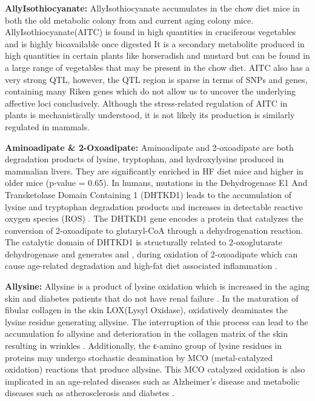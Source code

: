 \documentclass[a4paper,11pt,twoside]{book}
\begin{document}
    \textbf{AllyIsothiocyanate:}
	AllyIsothiocyanate accumulates in the chow diet mice in both the old metabolic colony from \citep{Williams2016SystemsFunction} and current aging colony mice. AllyIsothiocyanate(AITC) is found in high quantities in cruciferous vegetables and is highly bioavailable once digested \citep{Zlatkis1971ProfileUrine.} It is a secondary metabolite produced in high quantities in certain plants like horseradish and mustard but can be found in a large range of vegetables that may be present in the chow diet. AITC also has a very strong QTL, however, the QTL region is sparse in terms of SNPs and genes, containing many Riken genes which do not allow us to uncover the underlying affective loci conclusively. Although the stress-related regulation of AITC in plants is mechanistically understood, it is not likely its production is similarly regulated in mammals\citep{Kissen2016Allylisothiocyanate}.  

	\textbf{Aminoadipate \& 2-Oxoadipate:}
	Aminoadipate and 2-oxoadipate are both degradation products of lysine, tryptophan, and hydroxylysine produced in mammalian livers\citep{Higashino1965Saccharopine}. They are significantly enriched in HF diet mice and higher in older mice (p-value = 0.65). In humans, mutations in the Dehydrogenase E1 And Transketolase Domain Containing 1 (DHTKD1) leads to the accumulation of lysine and tryptophan degradation products and increases in detectable reactive oxygen species (ROS) \citep{Goncalves2016Production}. The DHTKD1 gene encodes a protein that catalyzes the conversion of 2-oxoadipate to glutaryl-CoA through a dehydrogenation reaction. The catalytic domain of DHTKD1 is structurally related to 2-oxoglutarate dehydrogenase and generates  and , during oxidation of 2-oxoadipate which can cause age-related degradation and high-fat diet associated inflammation \citep{Goncalves2016Production}. 

	\textbf{Allysine:}
	Allysine is a product of lysine oxidation which is increased in the aging skin and diabetes patients that do not have renal failure \citep{Sell20072aminoadipic}.  In the maturation of fibular collagen in the skin LOX(Lysyl Oxidase),  oxidatively deaminates the lysine residue generating allysine. The interruption of this process can lead to the accumulation fo allysine and deterioration in the collagen matrix of the skin resulting in wrinkles \citep{Bailey1998Mechanisms}. Additionally,  the ϵ-amino group of lysine residues in proteins may undergo stochastic deamination by MCO (metal-catalyzed oxidation) reactions that produce allysine. This MCO catalyzed oxidation is also implicated in an age-related diseases such as  Alzheimer's disease and metabolic diseases such as atherosclerosis and diabetes \citep{Stadtman2004Role}. 
\end{document}
